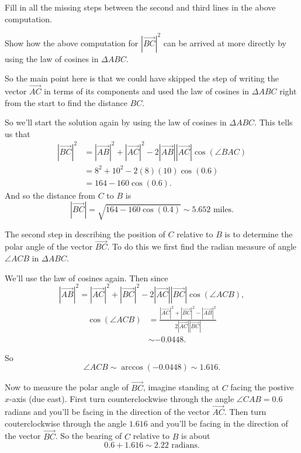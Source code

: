 \documentclass{ximera}
\begin{document}
\begin{example}
\begin{explanation}
\begin{question}  \label{Q4r345fg}
Fill in all the missing steps between the second and third lines in the above computation. 
\end{question}

\begin{question}  \label{Qer55ft4w}
Show how the above computation for $|\overrightarrow{BC}|^2$ can be arrived at more directly by using the law of cosines in $\Delta ABC$.
\end{question}

So the main point here is that we could have skipped the step of writing the vector $\overrightarrow{AC}$ in terms of its components and used the law of cosines in $\Delta ABC$ right from the start to find the distance $BC$. 

So we'll start the solution again by using the law of cosines in $\Delta ABC$. This tells us that
\begin{align*}
   |  \overrightarrow{BC} |^2 &=  |\overrightarrow{AB}|^2 + |\overrightarrow{AC}|^2 - 2|\overrightarrow{AB}||\overrightarrow{AC}| \cos (\angle BAC)  \\
                                          &= 8^2 + 10^2 - 2(8)(10) \cos(0.6)  \\
                                          &= 164-160 \cos(0.6) .
\end{align*}
And so the distance from $C$ to $B$ is
\[
   |  \overrightarrow{BC} | = \sqrt{164-160 \cos(0.4)} \sim 5.652 \text{ miles} .
\]

The second step in describing the position of $C$ relative to $B$ is to determine the polar angle of the vector $\overrightarrow{BC}$. To do this we first find the radian measure of angle $\angle ACB$ in $\Delta ABC$.

We'll use the law of cosines again. Then since
\[
    |\overrightarrow{AB}|^2 =  |\overrightarrow{AC}|^2 + |\overrightarrow{BC}|^2 - 2|\overrightarrow{AC}||\overrightarrow{BC}| \cos (\angle ACB)  ,
\]
\begin{align*}
   \cos(\angle ACB) &= \frac{|\overrightarrow{AC}|^2 + |\overrightarrow{BC}|^2 - |\overrightarrow{AB}|^2}{2|\overrightarrow{AC}||\overrightarrow{BC}|} \\
                           &\sim -0.0448 .
\end{align*}
 
So
\[
    \angle ACB \sim \arccos(-0.0448) \sim 1.616 .
\]

Now to measure the polar angle of $\overrightarrow{BC}$, imagine standing at $C$ facing the postive $x$-axis (due east). First turn counterclockwise through the angle $\angle CAB = 0.6$ radians and you'll be facing in the direction of the vector $\overrightarrow{AC}$. Then turn couterclockwise through the angle $1.616$ and you'll be facing in the direction of the vector $\overrightarrow{BC}$. So the bearing of $C$ relative to $B$ is about
\[
    0.6 + 1.616 \sim 2.22 \text{ radians} .
\]


\end{explanation}
\end{example}
\end{document}
